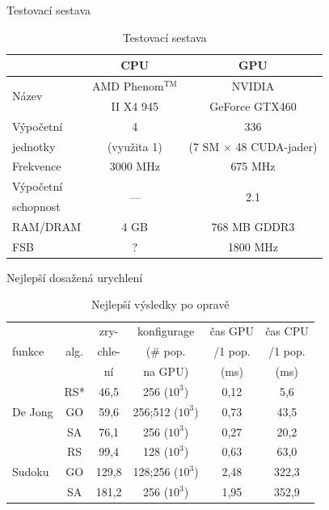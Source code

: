 \documentclass[compress,mathserif]{beamer}
\theoremstyle{definition}
\theoremstyle{plain}
\begin{document}
    \begin{frame}{Testovací sestava}
        \begin{table}
        \begin{tabular}{lcc}
          \toprule
          & CPU & GPU \\
          \midrule
          \multirow{2}{*}{Název} & AMD Phenom$^\mathrm{TM}$ & NVIDIA \\
                                & II X4 945 & GeForce GTX460 \vspace{2mm} \\
          Výpočetní & 4 & 336 \\
          jednotky & (využita 1) & (7 SM $\times$ 48 CUDA-jader) \\
          Frekvence & 3000 MHz & 675 MHz \\
          Výpočetní & \multirow{2}{*}{---} & \multirow{2}{*}{2.1} \\
          schopnost & & \\
          RAM/DRAM & 4 GB & 768 MB GDDR3 \\
          FSB & ? & 1800 MHz \\
          \bottomrule
        \end{tabular}
        \caption{Testovací sestava}
        \end{table}
    \end{frame}

    \begin{frame}{Nejlepší dosažená urychlení}
    \begin{table}[h]
    \begin{center}
    \begin{tabular}{lccccc}
      \toprule
      \multirow{3}{*}{funkce} & \multirow{3}{*}{alg.} & zry- & konfigurage & čas GPU &čas CPU\\
      & & chle- & (\# pop.  & /1 pop. & /1 pop. \\
      & & ní & na GPU) & (ms) & (ms)\\
      \midrule
      \multirow{3}{*}{De Jong} & RS* & 46,5 & 256 ($10^3$) & 0,12 & 5,6 \\
                            & GO & 59,6 & 256;512 ($10^3$) & 0,73 & 43,5\\
                            & SA & 76,1 & 256 ($10^3$) & 0,27 & 20,2 \\
      \midrule
      \multirow{3}{*}{Sudoku} & RS & 99,4 & 128 ($10^3$) & 0,63 & 63,0\\
                        & GO & 129,8 & 128;256 ($10^3$) & 2,48 & 322,3\\
                        & SA & 181,2 & 256 ($10^3$) & 1,95 & 352,9\\
      \bottomrule
    \end{tabular}
    \caption{Nejlepší výsledky po opravě}
    \end{center}
    \end{table}
    \end{frame}
\end{document}
